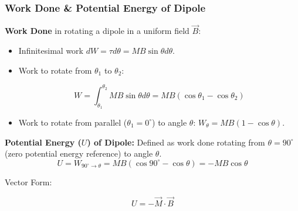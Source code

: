 \transfade[duration=0.5]

\begin{frame}[t]
    \frametitle{\textcolor{deepnavy}{\textbf{Work Done & Potential Energy of Dipole}}}
    \renewcommand{\familydefault}{\rmdefault}
    \small

      \item<+-> \textbf{Work Done} in rotating a dipole in a uniform field $\vec{B}$:
        \begin{itemize}[<+->]
              \item Infinitesimal work $dW = \tau d\theta = MB\sin\theta d\theta$.
              \item Work to rotate from $\theta_1$ to $\theta_2$:
            \begin{tcolorbox}[colback=blue!5,colframe=blue!80,boxrule=0.5pt,arc=1mm,boxsep=1pt]
            \begin{equation*}
                 W = \int_{\theta_1}^{\theta_2} MB\sin\theta d\theta = MB (\cos\theta_1 - \cos\theta_2)
            \end{equation*}
              \end{tcolorbox}
              \item Work to rotate from parallel ($\theta_1=0^\circ$) to angle $\theta$: $W_{\theta} = MB(1 - \cos\theta)$.
        \end{itemize}

      \item<+-> \textbf{Potential Energy ($U$) of Dipole:} Defined as work done rotating from $\theta=90^\circ$ (zero potential energy reference) to angle $\theta$.
          \begin{equation*} U = W_{90^\circ \to \theta} = MB(\cos 90^\circ - \cos\theta) = -MB\cos\theta \end{equation*}
    \item<+-> Vector Form:
        \begin{tcolorbox}[colback=orange!8,colframe=accentorange,boxrule=0.5pt,arc=1mm,boxsep=2pt]
        \begin{equation*}
             U = -\vec{M} \cdot \vec{B}
        \end{equation*}
          \end{tcolorbox}


\end{frame}
